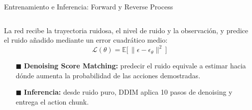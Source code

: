 \documentclass[aspectratio=169,10pt,xcolor={dvipsnames,table}]{beamer}
\newcommand{\CardTitleFont}{\fontsize{7.5}{9}\selectfont\bfseries}      %
\newcommand{\BodyFont}{\fontsize{6.2}{7.8}\selectfont}                  %
\newcommand{\CardArc}{2pt}                 %
\newcommand{\CardRule}{0.6pt}              %
\newcommand{\CardHeightDouble}{42.5mm}     %
\begin{document}
\begin{frame}{Entrenamiento e Inferencia: Forward y Reverse Process}
\begin{columns}[T, onlytextwidth]
    \begin{column}{0.485\textwidth}
      \begin{tcolorbox}[
        enhanced,
        colback=WhiteBg,
        colframe=UCNCyan,
        arc=\CardArc,
        boxrule=\CardRule,
        height=\CardHeightDouble,
        title={\CardTitleFont Reverse Process y Loss Function \cite{ho2020ddpm}},
        colbacktitle=UCNCyan,
        coltitle=WhiteBg,
        top=1.0mm, bottom=1.0mm, left=1.6mm, right=1.6mm
      ]
        {\BodyFont
        La red recibe la trayectoria ruidosa, el nivel de ruido y la observación, y predice el ruido añadido mediante un error cuadrático medio:
        \vspace{-0.5mm}
        \[
          \mathcal{L}(\theta) = \mathbb{E}\big[\, \| \epsilon - \epsilon_\theta \|^2 \,\big]
        \]
        \vspace{-1.5mm}
        \begin{itemize}\setlength{\itemsep}{0.8pt}
          \item[\textcolor{UCNCyan}{$\blacksquare$}] \textbf{Denoising Score Matching:} predecir el ruido equivale a estimar hacia dónde aumenta la probabilidad de las acciones demostradas.
          \item[\textcolor{UCNCyan}{$\blacksquare$}] \textbf{Inferencia:} desde ruido puro, DDIM aplica 10 pasos de denoising y entrega el action chunk.
        \end{itemize}}
      \end{tcolorbox}
    \end{column}
  \end{columns}
\end{frame}
\end{document}
